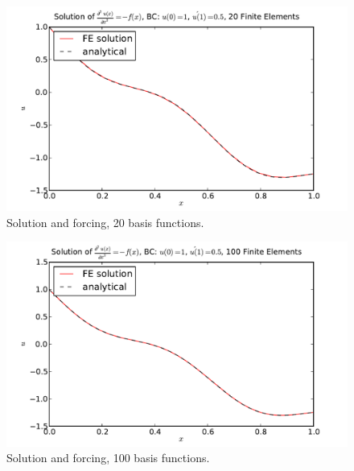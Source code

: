 \documentclass[10pt]{article}
\begin{document}
\begin{figure}[ht]
    \centering
    \includegraphics[width=\columnwidth,keepaspectratio=true]{./hw7-solution_and_forcing-N20.pdf}
    \caption{Solution and forcing, 20 basis functions.}
    \label{fig:sf20}
\end{figure}

\begin{figure}[ht]
    \centering
    \includegraphics[width=\columnwidth,keepaspectratio=true]{./hw7-solution_and_forcing-N100.pdf}
    \caption{Solution and forcing, 100 basis functions.}
    \label{fig:sf100}
\end{figure}
\end{document}
